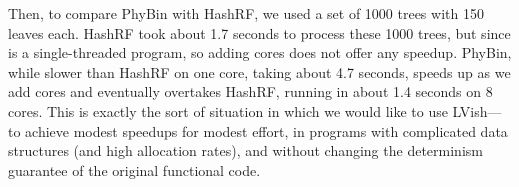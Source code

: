 Then, to compare PhyBin with HashRF, we used a set of 1000 trees with
150 leaves each.  HashRF took about 1.7 seconds to process these 1000
trees, but since is a single-threaded program, so adding cores does
not offer any speedup.  PhyBin, while slower than HashRF on one core,
taking about 4.7 seconds, speeds up as we add cores and eventually
overtakes HashRF, running in about 1.4 seconds on 8 cores.  This is
exactly the sort of situation in which we would like to use LVish---to
achieve modest speedups for modest effort, in programs with
complicated data structures (and high allocation rates), and without
changing the determinism guarantee of the original functional code.

